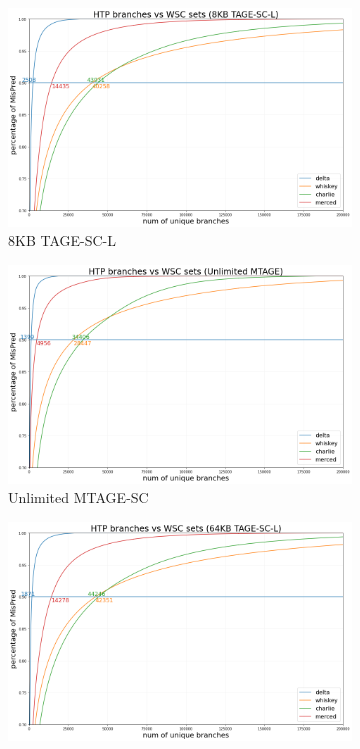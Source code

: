 \begin{figure}[h!] 
     \centering
     \begin{subfigure}{0.45\textwidth}
         \centering
         \includegraphics[width=1\textwidth]{Chapter3/Figs/HTP branches vs WSC sets (8KB TAGE-SC-L).png}
         \caption{8KB TAGE-SC-L}
     \end{subfigure}
     \begin{subfigure}{0.45\textwidth}
         \centering
         \includegraphics[width=1\textwidth]{Chapter3/Figs/HTP branches vs WSC sets (Unlimited MTAGE) (2).png}
         \caption{Unlimited MTAGE-SC}
     \end{subfigure}
     \hfill
     \begin{subfigure}{0.45\textwidth}
         \centering
         \includegraphics[width=1\textwidth]{Chapter3/Figs/HTP branches vs WSC sets (64KB TAGE-SC-L).png}

\end{subfigure}
\end{figure}
